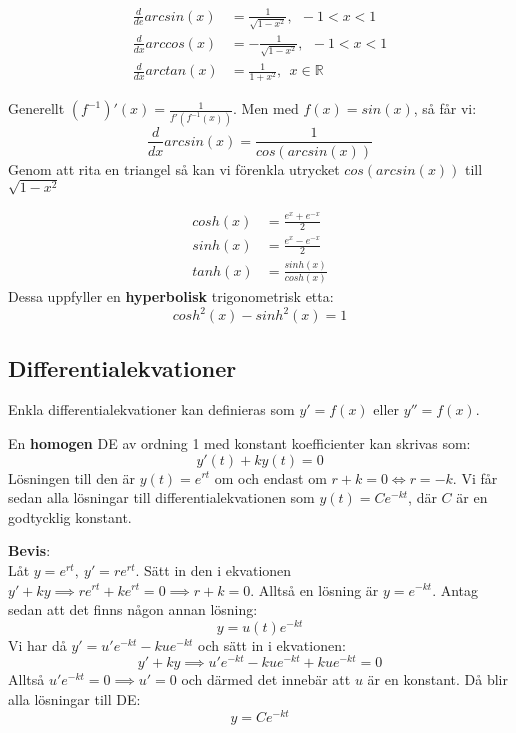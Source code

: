 \documentclass{report}
\begin{document}
{
\begin{align*}
	\frac{d}{de}arcsin(x) &= \frac{1}{ \sqrt{1-x^2} } ,\:\: -1 < x < 1\\
	\frac{d}{dx}arccos(x) &= - \frac{1}{ \sqrt{1-x^2} }, \:\: -1 < x < 1\\
	\frac{d}{dx}arctan(x) &= \frac{1}{1+x^2},\:\: x \in \mathbb{R}
\end{align*}

{
Generellt $ (f^{-1})'(x) = \frac{1}{f'(f^{-1}(x))}  $. Men med $ f(x) = sin(x) $, så får vi:
\begin{equation*}
\frac{d}{dx}arcsin(x) = \frac{1}{cos(arcsin(x))} 
\end{equation*}
Genom att rita en triangel så kan vi förenkla utrycket $ cos(arcsin(x)) $ till $ \sqrt{1-x^2}  $ 
}
}
\vspace{20pt}
{
\begin{align*}
	cosh(x) &= \frac{e^x+e^{-x}}{2}\\
	sinh(x) &= \frac{e^x-e^{-x}}{2}\\
	tanh(x) &= \frac{sinh(x)}{cosh(x)} 
\end{align*}
Dessa uppfyller en \textbf{hyperbolisk} trigonometrisk etta:
\begin{equation*}
cosh^2(x)-sinh^2(x) = 1
\end{equation*}
}

\pagebreak
\subsection{Differentialekvationer}
Enkla differentialekvationer kan definieras som $ y' = f(x) $ eller $ y'' = f(x) $.

{
En \textbf{homogen} DE av ordning 1 med konstant koefficienter kan skrivas som:
\begin{equation*}
y'(t) + ky(t) = 0
\end{equation*}
Lösningen till den är $ y(t) = e^{rt} $ om och endast om $ r+k = 0 \iff r = -k$. Vi får sedan alla lösningar till differentialekvationen som $ y(t) = Ce^{-kt} $, där $ C $ är en godtycklig konstant.  

\vspace{20pt}
\textbf{Bevis}:\\
Låt $ y = e^{rt},\:y' = re^{rt} $. Sätt in den i ekvationen $ y'+ky \implies re^{rt}+ke^{rt} = 0 \implies r+k = 0 $. Alltså en lösning är $ y = e^{-kt} $. Antag sedan att det finns någon annan lösning:
\begin{equation*}
	y = u(t)e^{-kt}
\end{equation*}
Vi har då $ y'= u'e^{-kt}-kue^{-kt} $ och sätt in i ekvationen:
\begin{equation*}
	y'+ky \implies u'e^{-kt}-kue^{-kt}+kue^{-kt} = 0
\end{equation*}
Alltså $ u'e^{-kt} = 0 \implies u' = 0 $ och därmed det innebär att $ u  $ är en konstant. Då blir alla lösningar till DE:
\begin{equation*}
	y = Ce^{-kt}
\end{equation*}
}
\end{document}
